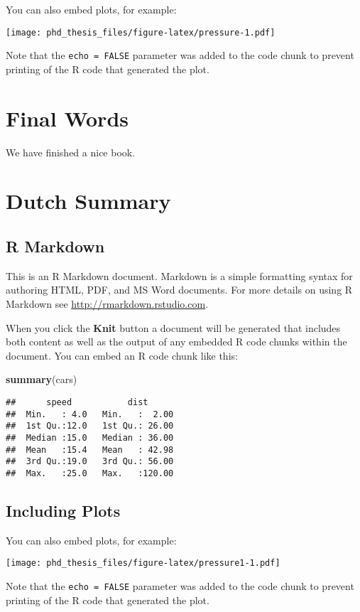 \documentclass[]{book}
\newenvironment{Shaded}{\begin{snugshade}}{\end{snugshade}}
\newcommand{\KeywordTok}[1]{\textcolor[rgb]{0.13,0.29,0.53}{\textbf{#1}}}
\newcommand{\NormalTok}[1]{#1}
\begin{document}
You can also embed plots, for example:

\texttt{[image: phd\_thesis\_files/figure-latex/pressure-1.pdf]}

Note that the \texttt{echo\ =\ FALSE} parameter was added to the code chunk to prevent printing of the R code that generated the plot.

\hypertarget{final-words}{%
\chapter{Final Words}\label{final-words}}

We have finished a nice book.

\hypertarget{dutchsum}{%
\chapter{Dutch Summary}\label{dutchsum}}

\hypertarget{r-markdown-1}{%
\section{R Markdown}\label{r-markdown-1}}

This is an R Markdown document. Markdown is a simple formatting syntax for authoring HTML, PDF, and MS Word documents. For more details on using R Markdown see \url{http://rmarkdown.rstudio.com}.

When you click the \textbf{Knit} button a document will be generated that includes both content as well as the output of any embedded R code chunks within the document. You can embed an R code chunk like this:

\begin{Shaded}
\begin{Highlighting}[]
\KeywordTok{summary}\NormalTok{(cars)}
\end{Highlighting}
\end{Shaded}

\begin{verbatim}
##      speed           dist       
##  Min.   : 4.0   Min.   :  2.00  
##  1st Qu.:12.0   1st Qu.: 26.00  
##  Median :15.0   Median : 36.00  
##  Mean   :15.4   Mean   : 42.98  
##  3rd Qu.:19.0   3rd Qu.: 56.00  
##  Max.   :25.0   Max.   :120.00
\end{verbatim}

\hypertarget{including-plots-1}{%
\section{Including Plots}\label{including-plots-1}}

You can also embed plots, for example:

\texttt{[image: phd\_thesis\_files/figure-latex/pressure1-1.pdf]}

Note that the \texttt{echo\ =\ FALSE} parameter was added to the code chunk to prevent printing of the R code that generated the plot.


\end{document}
